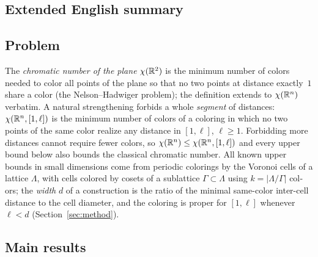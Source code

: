 \begin{otherlanguage}{english}
\section*{Extended English summary}

\subsection*{Problem}

The \emph{chromatic number of the plane} $\chi(\mathbb{R}^2)$ is the minimum number
of colors needed to color all points of the plane so that no two points at
distance exactly~$1$ share a color (the Nelson--Hadwiger problem); the
definition extends to $\chi(\mathbb{R}^n)$ verbatim. A natural strengthening forbids
a whole \emph{segment} of distances: $\chi(\mathbb{R}^n,[1,\ell])$ is the minimum
number of colors of a coloring in which no two points of the same color
realize any distance in $[1,\ell]$, $\ell\ge1$. Forbidding more distances
cannot require fewer colors, so
$\chi(\mathbb{R}^n)\le\chi(\mathbb{R}^n,[1,\ell])$ and every upper bound below also bounds
the classical chromatic number. All known upper bounds in small dimensions
come from periodic colorings by the Voronoi cells of a lattice $\Lambda$,
with cells colored by cosets of a sublattice $\Gamma\subset\Lambda$ using
$k=|\Lambda/\Gamma|$ colors; the \emph{width} $d$ of a construction is the
ratio of the minimal same-color inter-cell distance to the cell
diameter, and the coloring is proper for $[1,\ell]$ whenever $\ell<d$
(Section~\ref{sec:method}).

\subsection*{Main results}


\end{otherlanguage}
